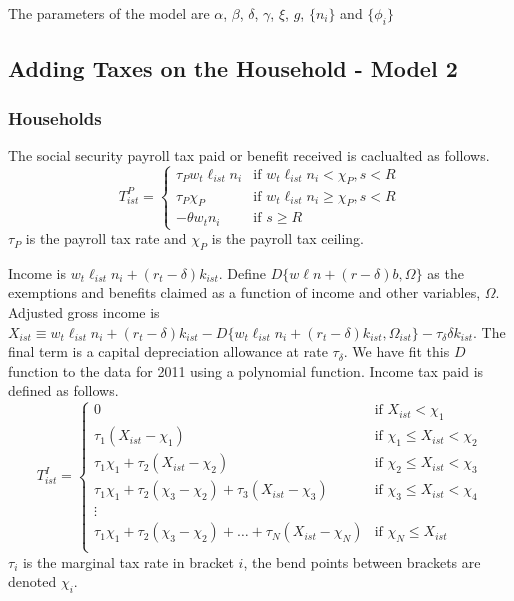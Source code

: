\documentclass[letterpaper,12pt]{article}
\theoremstyle{definition}
\numberwithin{equation}{section}
\begin{document}
\begin{spacing}{1.5}
      The parameters of the model are $\alpha$, $\beta$, $\delta$, $\gamma$, $\xi$, $g$, $\{n_i\}$ and $\{\phi_i\}$

    \newpage

  \subsection{Adding Taxes on the Household - Model 2}\label{SubSec_Macro_HHTax}
    \subsubsection{Households}
      The social security payroll tax paid or benefit received is caclualted as follows.
      \begin{equation}\label{Macro_HHTax_PayrollTax}
      T^P_{ist} = \left\{ \begin{matrix} \tau_P w_t \ell_{ist} n_i & \text{if } w_t \ell_{ist} n_i < \chi_P, s<R \\
                                         \tau_P \chi_P & \text{if } w_t \ell_{ist} n_i \ge \chi_P, s<R \\
                                         -\theta w_t n_i & \text{if } s\ge R
                                         \end{matrix} \right.
      \end{equation}
      $\tau_P$ is the payroll tax rate and $\chi_P$ is the payroll tax ceiling.

      Income is $w_t \ell_{ist} n_i + (r_t-\delta) k_{ist}$.  Define $D\{w\ell n+(r-\delta)b,\Omega\}$ as the exemptions and benefits claimed as a function of income and other variables, $\Omega$.  Adjusted gross income is $X_{ist} \equiv w_t \ell_{ist} n_i + (r_t-\delta) k_{ist} - D\{w_t \ell_{ist} n_i + (r_t-\delta) k_{ist},\Omega_{ist}\} -\tau_\delta \delta k_{ist}$.  The final term is a capital depreciation allowance at rate $\tau_\delta$.  We have fit this $D$ function to the data for 2011 using a polynomial function.  Income tax paid is defined as follows.
      \begin{equation}\label{Macro_HHTax_IncomeTax}
      T^I_{ist} = \left\{ \begin{matrix} 0 & \text{if } X_{ist} < \chi_1 \\
                  \tau_1 (X_{ist} - \chi_1) & \text{if }  \chi_1 \le X_{ist} < \chi_2 \\
                  \tau_1 \chi_1 + \tau_2 (X_{ist} - \chi_2) & \text{if }  \chi_2 \le X_{ist} < \chi_3 \\
                  \tau_1 \chi_1 + \tau_2 (\chi_3 - \chi_2) + \tau_3 (X_{ist} - \chi_3) & \text{if }  \chi_3 \le X_{ist} < \chi_4 \\
                  \vdots \\
                  \tau_1 \chi_1 + \tau_2 (\chi_3 - \chi_2) +\dots+ \tau_N (X_{ist} - \chi_N) & \text{if }  \chi_N \le X_{ist} \\
                  \end{matrix} \right.
      \end{equation}
      $\tau_i$ is the marginal tax rate in bracket $i$, the bend points between brackets are denoted $\chi_i$.


\end{spacing}
\end{document}
